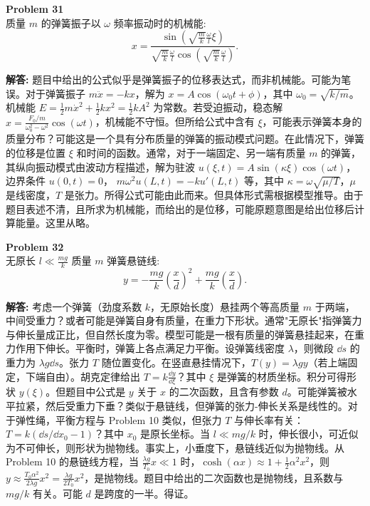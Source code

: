 \documentclass[12pt, a4paper, oneside]{ctexart}
\newenvironment{solution}{\par\noindent\textbf{解答:}\quad}{\par}
\begin{document}
\begin{mdframed}[backgroundcolor=gray!10, linewidth=0pt]
    \textbf{Problem 31} \\
    质量 \(m\) 的弹簧振子以 \(\omega\) 频率振动时的机械能:
    \[
    x = \frac{\sin\left(\sqrt{\frac{m}{k}}\frac{\omega}{l}\xi\right)}{\sqrt{\frac{m}{k}}\frac{\omega}{l}\cos\left(\sqrt{\frac{m}{k}}\frac{\omega}{l}\right)}.
    \]
\end{mdframed}
\begin{solution}
    题目中给出的公式似乎是弹簧振子的位移表达式，而非机械能。可能为笔误。对于弹簧振子 \(m\ddot{x} = -k x\)，解为 \(x = A \cos(\omega_0 t + \phi)\)，其中 \(\omega_0 = \sqrt{k/m}\)。机械能 \(E = \frac{1}{2} m \dot{x}^2 + \frac{1}{2} k x^2 = \frac{1}{2} k A^2\) 为常数。若受迫振动，稳态解 \(x = \frac{F_0/m}{\omega_0^2 - \omega^2} \cos(\omega t)\)，机械能不守恒。但所给公式中含有 \(\xi\)，可能表示弹簧本身的质量分布？可能这是一个具有分布质量的弹簧的振动模式问题。在此情况下，弹簧的位移是位置 \(\xi\) 和时间的函数。通常，对于一端固定、另一端有质量 \(m\) 的弹簧，其纵向振动模式由波动方程描述，解为驻波 \(u(\xi, t) = A \sin(\kappa \xi) \cos(\omega t)\)，边界条件 \(u(0,t)=0\)， \(m \omega^2 u(L,t) = -k u'(L,t)\) 等，其中 \(\kappa = \omega \sqrt{\mu/T}\)，\(\mu\) 是线密度，\(T\) 是张力。所得公式可能由此而来。但具体形式需根据模型推导。由于题目表述不清，且所求为机械能，而给出的是位移，可能原题意图是给出位移后计算能量。这里从略。
\end{solution}

\begin{mdframed}[backgroundcolor=gray!10, linewidth=0pt]
    \textbf{Problem 32} \\
    无原长 \(l\ll\frac{m g}{k}\) 质量 \(m\) 弹簧悬链线:
    \[
    y = -\frac{m g}{k} \left(\frac{x}{d}\right)^2 + \frac{m g}{k} \left(\frac{x}{d}\right).
    \]
\end{mdframed}
\begin{solution}
    考虑一个弹簧（劲度系数 \(k\)，无原始长度）悬挂两个等高质量 \(m\) 于两端，中间受重力？或者可能是弹簧自身有质量，在重力下形状。通常"无原长"指弹簧力与伸长量成正比，但自然长度为零。模型可能是一根有质量的弹簧悬挂起来，在重力作用下伸长。平衡时，弹簧上各点满足力平衡。设弹簧线密度 \(\lambda\)，则微段 \(\dd s\) 的重力为 \(\lambda g \dd s\)。张力 \(T\) 随位置变化。在竖直悬挂情况下，\(T(y) = \lambda g y\)（若上端固定，下端自由）。胡克定律给出 \(T = k \frac{\dd y}{\dd \xi}\)？其中 \(\xi\) 是弹簧的材质坐标。积分可得形状 \(y(\xi)\)。但题目中公式是 \(y\) 关于 \(x\) 的二次函数，且含有参数 \(d\)。可能弹簧被水平拉紧，然后受重力下垂？类似于悬链线，但弹簧的张力-伸长关系是线性的。对于弹性绳，平衡方程与 Problem 10 类似，但张力 \(T\) 与伸长率有关：\(T = k (\dd s / \dd x_0 - 1)\)？其中 \(x_0\) 是原长坐标。当 \(l \ll mg/k\) 时，伸长很小，可近似为不可伸长，则形状为抛物线。事实上，小垂度下，悬链线近似为抛物线。从 Problem 10 的悬链线方程，当 \(\frac{\lambda g}{T_0} x \ll 1\) 时，\(\cosh(\alpha x) \approx 1 + \frac{1}{2} \alpha^2 x^2\)，则 \(y \approx \frac{T_0 \alpha^2}{2\lambda g} x^2 = \frac{\lambda g}{2T_0} x^2\)，是抛物线。题目中给出的二次函数也是抛物线，且系数与 \(mg/k\) 有关。可能 \(d\) 是跨度的一半。得证。
\end{solution}
\end{document}
